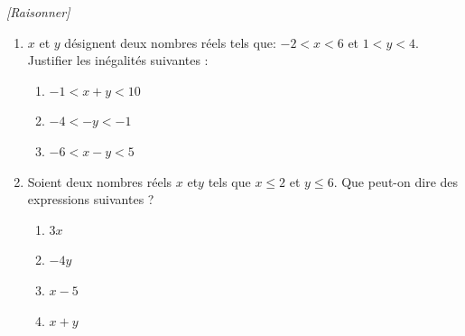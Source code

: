 \exo \textit{[Raisonner]}

\begin{enumerate}
\item $x$ et $y$ désignent deux nombres réels tels que: $-2<x<6$ et $1<y<4$. Justifier les inégalités suivantes :
\begin{enumerate}[label=\alph*)]
\item $-1<x+y<10$
\item $-4<-y<-1$
\item $-6<x-y<5$
\end{enumerate}
\item Soient deux nombres réels $x$ et$y$ tels que $x \leqslant 2$ et $y \leqslant 6$. Que peut-on dire des expressions suivantes ?
\begin{enumerate}[label=\alph*)]
\item $3x$
\item $-4y$
\item $x-5$
\item $x+y$
\end{enumerate}

\end{enumerate}




      

